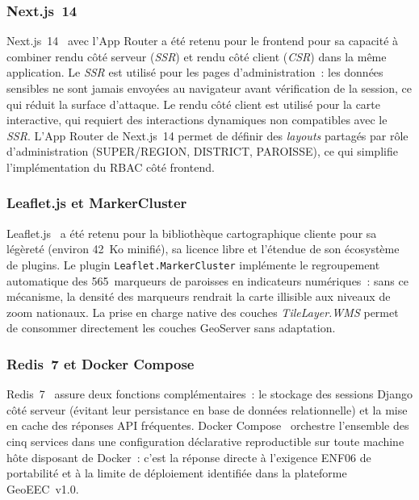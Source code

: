 \subsubsection{Next.js~14}

Next.js~14~\cite{nextjs2024} avec l'App Router a été retenu pour le frontend
pour sa capacité à combiner rendu côté serveur (\textit{SSR}) et rendu côté
client (\textit{CSR}) dans la même application. Le \textit{SSR} est
utilisé pour les pages d'administration~: les données sensibles ne sont
jamais envoyées au navigateur avant vérification de la session, ce qui
réduit la surface d'attaque. Le rendu côté client est utilisé pour la carte
interactive, qui requiert des interactions dynamiques non compatibles avec
le \textit{SSR}. L'App Router de Next.js~14 permet de définir des
\textit{layouts} partagés par rôle d'administration (SUPER/REGION,
DISTRICT, PAROISSE), ce qui simplifie l'implémentation du RBAC côté
frontend.

\subsubsection{Leaflet.js et MarkerCluster}

Leaflet.js~\cite{leaflet2024} a été retenu pour la bibliothèque
cartographique cliente pour sa légèreté (environ 42~Ko minifié), sa licence
libre et l'étendue de son écosystème de plugins. Le plugin
\texttt{Leaflet.MarkerCluster} implémente le regroupement automatique des
565~marqueurs de paroisses en indicateurs numériques~: sans ce mécanisme,
la densité des marqueurs rendrait la carte illisible aux niveaux de zoom
nationaux. La prise en charge native des couches \textit{TileLayer.WMS}
permet de consommer directement les couches GeoServer sans adaptation.

\subsubsection{Redis~7 et Docker Compose}

Redis~7~\cite{redis2024} assure deux fonctions complémentaires~:
le stockage des sessions Django côté serveur (évitant leur persistance
en base de données relationnelle) et la mise en cache des réponses API
fréquentes. Docker Compose~\cite{docker2024} orchestre l'ensemble des
cinq services dans une configuration déclarative reproductible sur toute
machine hôte disposant de Docker~: c'est la réponse directe à l'exigence
ENF06 de portabilité et à la limite de déploiement identifiée dans la
plateforme GeoEEC~v1.0.

